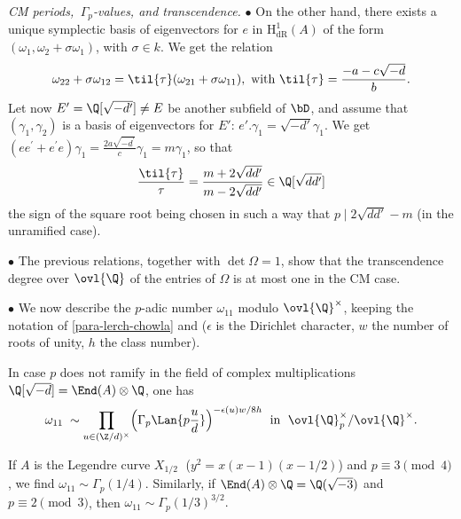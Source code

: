 \begin{para} {\itshape CM periods, $\,\Gamma_p$-values, and transcendence.}
 \medskip\noindent $\bullet$ On the other hand, there exists a unique symplectic basis
 of eigenvectors for $e$ in $\mathrm{H}^1_{\mathrm{dR}}(A)$ of the form
 $(\omega_1,\omega_2+\sigma \omega_1)$, with
 $\sigma \in k$. We get the relation
 \begin{equation*}
  \omega_{22}+\sigma\omega_{12} = {\til{\tau}}
   (\omega_{21} + \sigma\omega_{11}), \text{ with } {\til{\tau}} =
   \frac{-a-c\sqrt{-d}}{b}.
 \end{equation*} 
 Let now $E'={\Q}[\sqrt{-d'}]\neq E$ be another subfield of $\bD$,
 and assume that $(\gamma_1,\gamma_2)$ is a basis of eigenvectors for
 $E'$: $e'.\gamma_1=\sqrt{-d'}\gamma_1$. We get
 $(ee^{\prime}+e^{\prime}e)\gamma_1=\frac{2a\sqrt{-d^{\prime}}}{c}\gamma_1
 = m\gamma_1$, so that
 \begin{equation*}
 \frac{\til{\tau}}{\tau} =
 \frac{m+2 \sqrt{dd^{\prime}}}{m-2\sqrt{dd^{\prime}}}
 \in {\Q}[\sqrt{dd^{\prime}}]
 \end{equation*}
  the sign of the square root being chosen in such a way that $p \mid
 {2\sqrt{dd'} -m}$ (in the unramified case).

 \medskip\noindent $\bullet$ The previous relations, together with $\det\Omega =
 1$, show that the transcendence degree over $\ovl{\Q}$ of the entries
 of $\Omega$ is at most one in the CM case. 

 \medskip\noindent $\bullet$ We now describe the
 $p$-adic number $\omega_{11}$ modulo $\ovl{\Q}^{\times}$, keeping the
 notation of \ref{para-lerch-chowla} and 
 ($\epsilon$ is the Dirichlet 
 character, $w$ the number of roots of unity, $h$ the class number).

 \begin{thm}\label{thm-cm-period}
  In case $p$ does not ramify in the field of
  complex multiplications ${\Q}[\sqrt{-d}] = \End(A)\otimes{\Q}$, one has
  \begin{equation*}
   \omega_{11}\; \sim \prod_{u\in ({\Z}/d)^{\times}}
    \Bigl(\Gamma_p\Lan{p\frac{u}{d}}\Bigr)^{-\epsilon(u)w/8h} \;\text{ in }\;
    \ovl{\Q}_p^{\times}/\ovl{\Q}^{\times}.
  \end{equation*}
   \end{thm}

\medskip {} If $A$ is the Legendre curve $X_{1/2}\;$
  ($y^2=x(x-1)(x-1/2)$)
  and $p\equiv 3\pmod{4}$, we find $\omega_{11} \sim \Gamma_p(1/4) .$
  Similarly, if $\End(A)
  \otimes {\Q} = {\Q}(\sqrt{-3})$ and $p\equiv 2\pmod{3}$, then
  $\omega_{11} \sim
  \Gamma_p(1/3)^{3/2}.$


\end{para}
